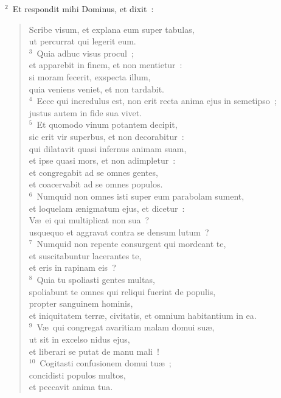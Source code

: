 ${}^{2}$~Et respondit mihi Dominus, et dixit~: \begin{flushleft}\begin{verse}Scribe visum, et explana eum super tabulas,\\ ut percurrat qui legerit eum.\\
${}^{3}$~Quia adhuc visus procul~;\\ et apparebit in finem, et non mentietur~:\\ si moram fecerit, exspecta illum,\\ quia veniens veniet, et non tardabit.\\
${}^{4}$~Ecce qui incredulus est, non erit recta anima ejus in semetipso~;\\ justus autem in fide sua vivet.\\
${}^{5}$~Et quomodo vinum potantem decipit,\\ sic erit vir superbus, et non decorabitur~:\\ qui dilatavit quasi infernus animam suam,\\ et ipse quasi mors, et non adimpletur~:\\ et congregabit ad se omnes gentes,\\ et coacervabit ad se omnes populos.\\
${}^{6}$~Numquid non omnes isti super eum parabolam sument,\\ et loquelam \ae nigmatum ejus, et dicetur~:\\ V\ae\ ei qui multiplicat non sua~?\\ usquequo et aggravat contra se densum lutum~?\\
${}^{7}$~Numquid non repente consurgent qui mordeant te,\\ et suscitabuntur lacerantes te,\\ et eris in rapinam eis~?\\
${}^{8}$~Quia tu spoliasti gentes multas,\\ spoliabunt te omnes qui reliqui fuerint de populis,\\ propter sanguinem hominis,\\ et iniquitatem terr\ae , civitatis, et omnium habitantium in ea.\\
${}^{9}$~V\ae\ qui congregat avaritiam malam domui su\ae ,\\ ut sit in excelso nidus ejus,\\ et liberari se putat de manu mali~!\\
${}^{10}$~Cogitasti confusionem domui tu\ae~;\\ concidisti populos multos,\\ et peccavit anima tua.\\

\end{verse}
\end{flushleft}
